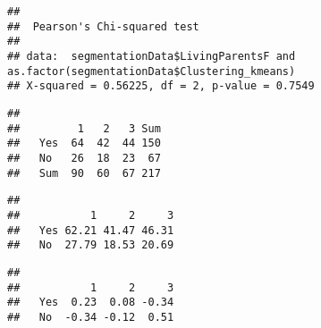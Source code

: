 \documentclass[
]{article}
\newenvironment{Shaded}{\begin{snugshade}}{\end{snugshade}}
\newcommand{\DecValTok}[1]{\textcolor[rgb]{0.00,0.00,0.81}{#1}}
\newcommand{\FunctionTok}[1]{\textcolor[rgb]{0.00,0.00,0.00}{#1}}
\newcommand{\NormalTok}[1]{#1}
\newcommand{\OtherTok}[1]{\textcolor[rgb]{0.56,0.35,0.01}{#1}}
\newcommand{\SpecialCharTok}[1]{\textcolor[rgb]{0.00,0.00,0.00}{#1}}
\begin{document}
\begin{Shaded}
\end{Shaded}

\begin{verbatim}
## 
##  Pearson's Chi-squared test
## 
## data:  segmentationData$LivingParentsF and as.factor(segmentationData$Clustering_kmeans)
## X-squared = 0.56225, df = 2, p-value = 0.7549
\end{verbatim}

\begin{Shaded}
\end{Shaded}

\begin{verbatim}
##      
##         1   2   3 Sum
##   Yes  64  42  44 150
##   No   26  18  23  67
##   Sum  90  60  67 217
\end{verbatim}

\begin{Shaded}
\end{Shaded}

\begin{verbatim}
##      
##           1     2     3
##   Yes 62.21 41.47 46.31
##   No  27.79 18.53 20.69
\end{verbatim}

\begin{Shaded}
\end{Shaded}

\begin{verbatim}
##      
##           1     2     3
##   Yes  0.23  0.08 -0.34
##   No  -0.34 -0.12  0.51
\end{verbatim}
\end{document}
